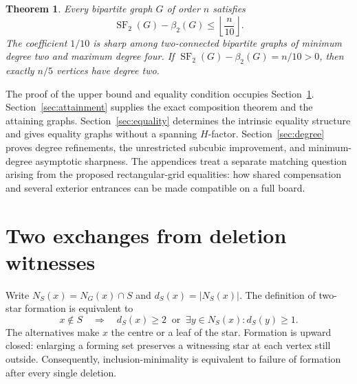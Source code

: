 \documentclass[11pt]{article}
\newtheorem{theorem}{Theorem}
\newcommand{\SF}{\operatorname{SF}_2}
\newcommand{\diss}{\beta_2}
\newcommand{\NS}{N_S}
\begin{document}
\begin{theorem}\label{thm:gap}
Every bipartite graph $G$ of order $n$ satisfies
\[
  \SF(G)-\diss(G)\le\left\lfloor\frac n{10}\right\rfloor.
\]
The coefficient $1/10$ is sharp among two-connected bipartite graphs of
minimum degree two and maximum degree four. If
$\SF(G)-\diss(G)=n/10>0$, then exactly $n/5$ vertices have degree two.
\end{theorem}

The proof of the upper bound and equality condition occupies
Section~\ref{sec:bound}. Section~\ref{sec:attainment} supplies the exact
composition theorem and the attaining graphs. Section~\ref{sec:equality}
determines the intrinsic equality structure and gives equality graphs
without a spanning $H$-factor. Section~\ref{sec:degree} proves degree
refinements, the unrestricted subcubic improvement, and minimum-degree
asymptotic sharpness. The appendices treat
a separate matching question arising from the proposed rectangular-grid
equalities: how shared compensation and several exterior entrances can
be made compatible on a full board.

\section{Two exchanges from deletion witnesses}\label{sec:bound}

Write $\NS(x)=N_G(x)\cap S$ and $d_S(x)=|\NS(x)|$. The definition of
two-star formation is equivalent to
\begin{equation}\label{eq:local}
 x\notin S\quad\Longrightarrow\quad
 d_S(x)\ge2\ \text{ or }\
 \exists y\in\NS(x):d_S(y)\ge1.
\end{equation}
The alternatives make $x$ the centre or a leaf of the star. Formation is
upward closed: enlarging a forming set preserves a witnessing star at
each vertex still outside. Consequently, inclusion-minimality is
equivalent to failure of formation after every single deletion.
\end{document}
